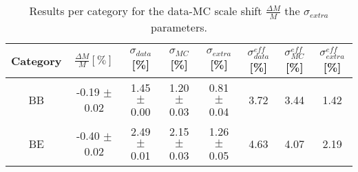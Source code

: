 \begin{table}[htb]
\begin{center}
\begin{tabular}{cccccccc}
\hline
Category & $\frac{\Delta M}{M} [\%]$ & $\sigma_{data}$ [\%] & $\sigma_{MC}$ [\%] & $\sigma_{extra}$ [\%] & $\sigma_{data}^{eff}$ [\%] & $\sigma_{MC}^{eff}$ [\%] & $\sigma_{extra}^{eff}$ [\%]\\ \hline
BB & -0.19 $\pm$ 0.02 & 1.45 $\pm$ 0.00 & 1.20 $\pm$ 0.03 & 0.81 $\pm$ 0.04 & 3.72 & 3.44 & 1.42 \\
BE & -0.40 $\pm$ 0.02 & 2.49 $\pm$ 0.01 & 2.15 $\pm$ 0.03 & 1.26 $\pm$ 0.05 & 4.63 & 4.07 & 2.19 \\
\hline
\end{tabular}
\caption{Results per category for the data-MC scale shift $\frac{\Delta M}{M}$ the $\sigma_{extra}$ parameters. \label{tab:extra}} 
\end{center}
\end{table}
